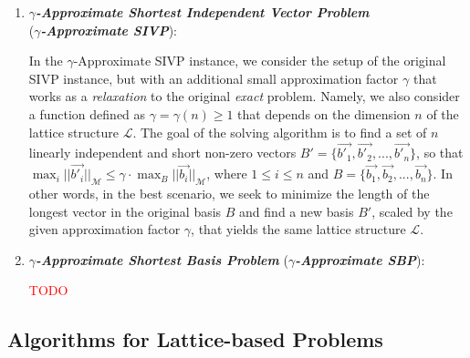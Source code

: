 \documentclass[runningheads]{llncs}
\numberwithin{equation}{section}
\begin{document}
\begin{enumerate}
        \item \textbf{\textit{$\gamma$-Approximate Shortest Independent Vector Problem}}\\(\textbf{\textit{$\gamma$-Approximate SIVP}}):
        \vspace{0.6ex}
        
        In the $\gamma$-Approximate SIVP instance, we consider the setup of the original SIVP instance, but with an additional small approximation factor $\gamma$ that works as a \textit{relaxation} to the original \textit{exact} problem. Namely, we also consider a function defined as $\gamma = \gamma(n) \geq 1$ that depends on the dimension $n$ of the lattice structure $\mathcal{L}$. The goal of the solving algorithm is to find a set of $n$ linearly independent and short non-zero vectors $B' = \{ \Vec{{b'}_{1}}, \Vec{{b'}_{2}}, ..., \Vec{{b'}_{n}} \}$, so that ${\max}_{i} {||\Vec{{b'}_{i}}||}_{\mathcal{M}} \leq \gamma \cdot {\max}_{B} {||\Vec{{b}_{i}}||}_{\mathcal{M}}$, where $1 \leq i \leq n$ and $B = \{ \Vec{{b}_{1}}, \Vec{{b}_{2}}, ..., \Vec{{b}_{n}} \}$. In other words, in the best scenario, we seek to minimize the length of the longest vector in the original basis $B$ and find a new basis $B'$, scaled by the given approximation factor $\gamma$, that yields the same lattice structure $\mathcal{L}$.
        \vspace{2ex}
        
        \item \textbf{\textit{$\gamma$-Approximate Shortest Basis Problem}} (\textbf{\textit{$\gamma$-Approximate SBP}}):
        \vspace{0.6ex}

        \textcolor{red}{TODO}
        \vspace{2ex}
        
        
        
    \end{enumerate}
    
    \subsection{Algorithms for Lattice-based Problems}
    \label{subsec:algorithms-for-lattice-based-problems}
    
    \newpage
    
    
\end{document}
